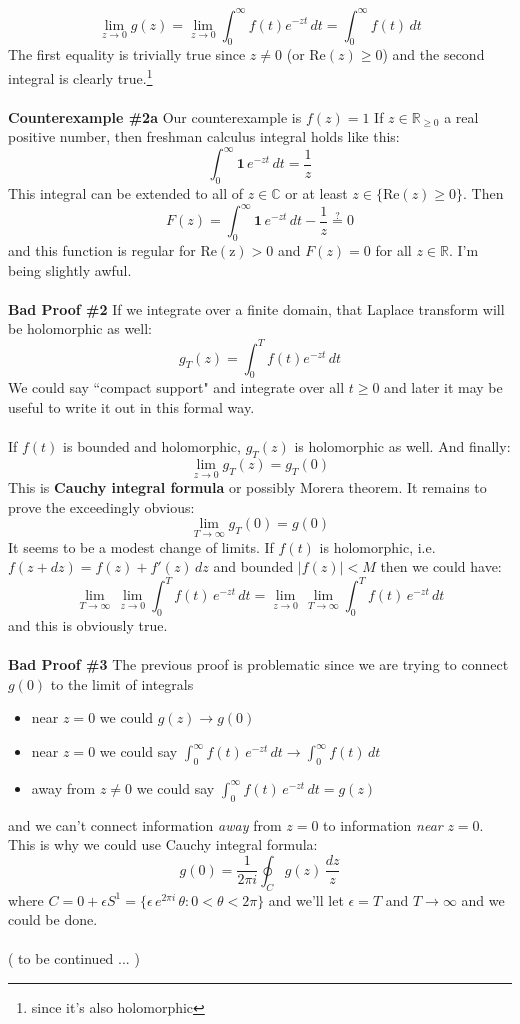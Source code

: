 \documentclass[12pt]{article}
\begin{document}
$$ \lim_{z \to 0} g(z) = \lim_{z \to 0} \int_0^\infty f(t) e^{-zt} \, dt = \int_0^\infty f(t) \, dt $$
The first equality is trivially true since $z \neq 0$ (or $\mathrm{Re}(z) \geq 0$) and the second integral is clearly true.\footnote{since it's also holomorphic} \\ \\
\textbf{Counterexample \#2a} Our counterexample is $\boxed{f(z) = 1}$ If $z \in \mathbb{R}_{\geq 0}$ a real positive number, then freshman calculus integral holds like this:
$$ \int_0^\infty \mathbf{1} \, e^{-zt} \, dt = \frac{1}{z} $$
This integral can be extended to all of $z \in \mathbb{C}$ or at least $z \in \{  \mathrm{Re}(z) \geq 0\}$.  Then
$$ F(z) = \int_0^\infty \mathbf{1} \, e^{-zt} \, dt - \frac{1}{z}  \stackrel{?}{=} 0 $$
and this function is regular for $\mathrm{Re(z)} > 0$ and $F(z) = 0$ for all $z \in \mathbb{R}$. I'm being slightly awful. \\ \\
\textbf{Bad Proof \#2} If we integrate over a finite domain, that Laplace transform will be holomorphic as well:
$$ g_T(z) = \int_0^T f(t) e^{-zt} \, dt  $$
We could say ``compact support" and integrate over all $t \geq 0$ and later it may be useful to write it out in this formal way. \\ \\
If $f(t)$ is bounded and holomorphic, $g_T(z)$ is holomorphic as well.  And finally:
$$ \lim_{z \to 0} g_T(z) = g_T(0) $$
This is \textbf{Cauchy integral formula} or possibly Morera theorem.  It remains to prove the exceedingly obvious:
$$ \lim_{T \to \infty} g_T(0) = g(0) $$
It seems to be a modest change of limits.  If $f(t)$ is holomorphic, i.e. $f(z + dz) = f(z) + f'(z) \, dz$ and bounded $|f(z)| < M$ then we could have:
$$ \lim_{T \to \infty} \, \lim_{z \to 0} \int_0^T f(t) \, e^{-zt} \, dt
= \lim_{z \to 0} \, \lim_{T \to \infty} \int_0^T f(t) \, e^{-zt} \, dt $$ 
and this is obviously true. \\ \\
\textbf{Bad Proof \#3} The previous proof is problematic since we are trying to connect $g(0)$ to the limit of integrals 
\begin{itemize}
\item near $z = 0$ we could $g(z) \to g(0) $
\item near $z = 0$ we could say  $\int_0^\infty f(t)\, e^{-zt} \, dt \to \int_0^\infty f(t) \, dt $
\item away from $z \neq 0$ we could say $\int_0^\infty f(t)\, e^{-zt} \, dt = g(z) $
\end{itemize}
and we can't connect information \textit{away} from $z = 0$ to information \textit{near} $z=0$.  This is why we could use Cauchy integral formula:
$$ g(0) = \frac{1}{2\pi i } \oint_C g(z) \, \frac{dz}{z}$$
where $C = 0 + \epsilon S^1 = \big\{ \epsilon \, e^{2\pi i} \, \theta : 0 < \theta < 2\pi \big\}$ and we'll let $\epsilon = T$ and $T \to \infty$ and we could be done. \\ \\
( to be continued ... )
\vfill
\end{document}
